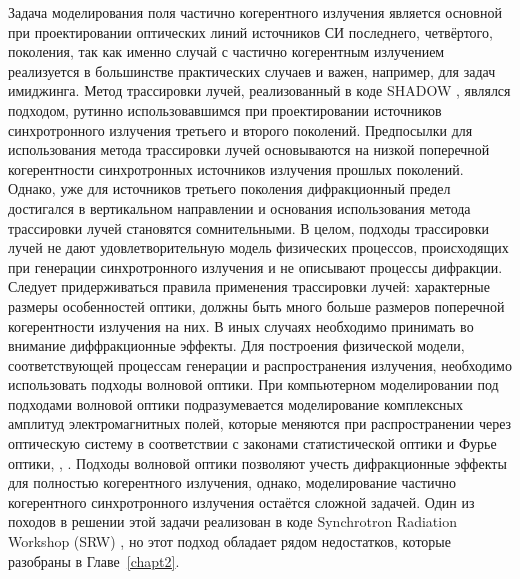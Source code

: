 Задача моделирования поля частично когерентного излучения является основной при проектировании оптических линий источников СИ последнего, четвёртого, поколения, так как именно случай с частично когерентным излучением реализуется в большинстве практических случаев и важен, например, для задач имиджинга. Метод трассировки лучей, реализованный в коде SHADOW \cite{sanchez_del_rio_shadow3_2011}, являлся подходом, рутинно использовавшимся при проектировании источников синхротронного излучения третьего и второго поколений. Предпосылки для использования метода трассировки лучей основываются на низкой поперечной когерентности синхротронных источников излучения прошлых поколений. Однако, уже для источников третьего поколения дифракционный предел достигался в вертикальном направлении и основания использования метода трассировки лучей становятся сомнительными. В целом, подходы трассировки лучей не дают удовлетворительную модель физических процессов, происходящих при генерации синхротронного излучения и не описывают процессы дифракции. Следует придерживаться правила применения трассировки лучей: характерные размеры особенностей оптики, должны быть много больше размеров поперечной когерентности излучения на них. В иных случаях необходимо принимать во внимание диффракционные эффекты.
Для построения физической модели, соответствующей процессам генерации и распространения излучения, необходимо использовать подходы волновой оптики. При компьютерном моделировании под подходами волновой оптики подразумевается моделирование комплексных амплитуд электромагнитных полей, которые меняются при распространении через оптическую систему в соответствии с законами статистической оптики и Фурье оптики, \cite{goodman_introduction_2005}, \cite{goodman_statistical_2015}. Подходы волновой оптики позволяют учесть дифракционные эффекты для полностью когерентного излучения, однако, моделирование частично когерентного синхротронного излучения остаётся сложной задачей. Один из походов в решении этой задачи реализован в коде Synchrotron Radiation Workshop (SRW) \cite{chubar_accurate_1998}, но этот подход обладает рядом недостатков, которые разобраны в Главе~\ref{chapt2}.

